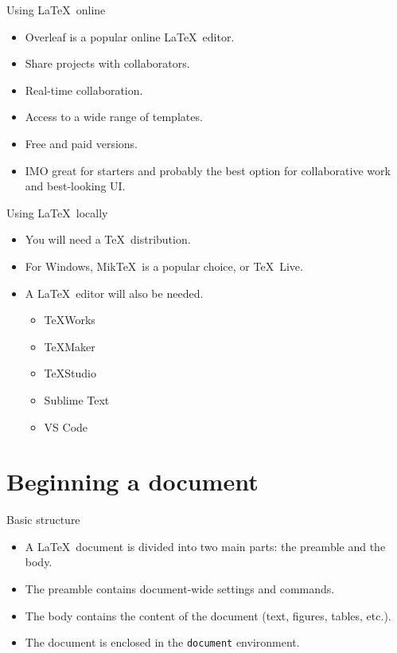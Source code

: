 \documentclass[t,12pt,xcolor=dvipsnames]{beamer}
\begin{document}
\begin{frame}{Using \LaTeX \ online}
    \begin{itemize}
        \item Overleaf is a popular online \LaTeX \ editor.
        \item Share projects with collaborators.
        \item Real-time collaboration.
        \item Access to a wide range of templates.
        \item Free and paid versions.
        \item IMO great for starters and probably the best option for collaborative work and best-looking UI.
    \end{itemize}
\end{frame}

\begin{frame}{Using \LaTeX \ locally}
    \begin{itemize}
        \item You will need a \TeX \ distribution.
        \item For Windows, Mik\TeX \ is a popular choice, or \TeX \ Live.
        \item A \LaTeX \ editor will also be needed.
        \begin{itemize}
            \item \TeX Works
            \item \TeX Maker
            \item \TeX Studio
            \item Sublime Text
            \item VS Code
        \end{itemize}
    \end{itemize}
\end{frame}

\section{Beginning a document}

\begin{frame}{Basic structure}
    \begin{itemize}
        \item A \LaTeX \ document is divided into two main parts: the preamble and the body.
        \item The preamble contains document-wide settings and commands.
        \item The body contains the content of the document (text, figures, tables, etc.).
        \item The document is enclosed in the \texttt{document} environment.
    \end{itemize}
\end{frame}
\end{document}
